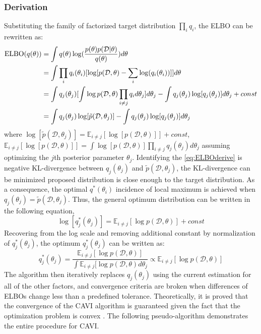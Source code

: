 \subsubsection{Derivation}
Substituting the family of factorized target distribution $\prod_i q_i$, the ELBO can be rewritten as:
\begin{equation}
	\label{eq:ELBOderive}	
	\begin{aligned}
		\textnormal{ELBO}(q(\theta)) &= \int q(\theta)\log(\frac{p(\theta)p(\mathcal{D}|\theta)}{q(\theta)})d\theta \\
		&= \int \prod_i q_i(\theta_i) [\log[p(\mathcal{D},\theta) - \sum_i \log(q_i(\theta_i))]]d\theta \\
		&= \int q_j(\theta_j)[\int \log p(\mathcal{D},\theta) \prod_{i\neq j}q_i d\theta_j]d\theta_j - \int q_j(\theta_j) \log[q_j(\theta_j)]d\theta_j + const\\
		&= \int q_j(\theta_j) \log[\tilde{p}(\mathcal{D},\theta_j)] - \int q_j(\theta_j) \log[q_j(\theta_j)]d\theta_j
	\end{aligned}
\end{equation}
where $\log[\tilde{p}(\mathcal{D},\theta_j)] = \mathbb{E}_{i \neq j}[\log[p(\mathcal{D},\theta)]] + const$,\\ $\mathbb{E}_{i\neq j}[\log[p(\mathcal{D},\theta)]] = \int \log[p(\mathcal{D},\theta)]\prod_{i\neq j}q_j(\theta_j)d\theta_j$ assuming optimizing the $j$th posterior parameter $\theta_j$.
Identifying the \autoref{eq:ELBOderive} is negative KL-divergence between $q_j(\theta_j) $ and $\tilde{p}(\mathcal{D},\theta_j)$, the KL-divergence can be minimized proposed distribution is close enough to the target distribution. As a consequence, the optimal $q^{*}(\theta_i)$ incidence of local maximum is achieved when $q_j(\theta_j) = \tilde{p}(\mathcal{D},\theta_j)$. Thus, the general optimum distribution can be written in the following equation,
\begin{equation}
	\label{eq:logoptimumQ}
	\log[q_j^*(\theta_j)] = \mathbb{E}_{i\neq j}[\log p(\mathcal{D},\theta)] + const
\end{equation}
Recovering from the log scale and removing additional constant by normalization of $q_j^*(\theta_j)$, the optimum $q_j^*(\theta_j)$ can be written as:
\begin{equation}
	\label{eq:optimalSolution}
	q_j^*(\theta_j) = \frac{\mathbb{E}_{i\neq j}[\log p(\mathcal{D},\theta)]}{\int \mathbb{E}_{i\neq j}[\log p(\mathcal{D},\theta)d\theta_j} \propto \mathbb{E}_{i\neq j}[\log p(\mathcal{D},\theta)]
\end{equation}
The algorithm then iteratively replaces $q_j(\theta_j)$ using the current estimation for all of the other factors, and convergence criteria are broken when differences of ELBOs change less than a predefined tolerance. Theoretically, it is proved that the convergence of the CAVI algorithm is guaranteed given the fact that the optimization problem is convex \cite{boyd2004convex}. The following pseudo-algorithm demonstrates the entire procedure for CAVI.

